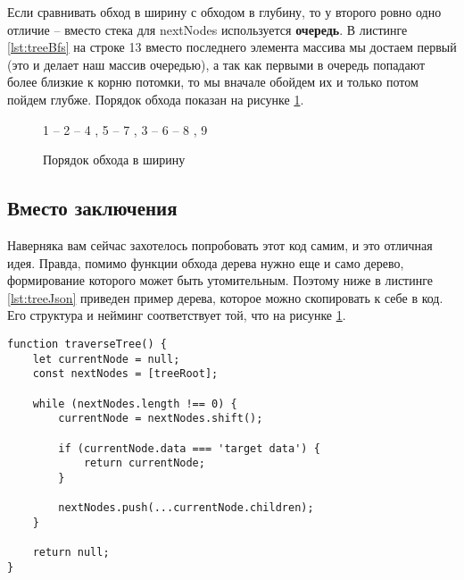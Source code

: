 \documentclass[../../article]{subfiles}
\begin{document}
Если сравнивать обход в ширину с обходом в глубину, то у второго ровно одно отличие – вместо стека для {\firacodebold nextNodes} используется {\bfseries очередь}. В листинге \ref{lst:treeBfs} на строке 13 вместо последнего элемента массива мы достаем первый (это и делает наш массив очередью), а так как первыми в очередь попадают более близкие к корню потомки, то мы вначале обойдем их и только потом пойдем глубже. Порядок обхода показан на рисунке \ref{fig:treeBfsOrder}.

\begin{figure}
    \styledgraph
    {
        1 -- { 2 -- { 4 , 5 -- 7 }, 3 -- 6 -- { 8 , 9 }}
    }
    \caption{Порядок обхода в ширину}
    \label{fig:treeBfsOrder}
\end{figure}

\subsection{Вместо заключения}
Наверняка вам сейчас захотелось попробовать этот код самим, и это отличная идея. Правда, помимо функции обхода дерева нужно еще и само дерево, формирование которого может быть утомительным. Поэтому ниже в листинге \ref{lst:treeJson} приведен пример дерева, которое можно скопировать к себе в код. Его структура и нейминг соответствует той, что на рисунке \ref{fig:treeBfsOrder}.

\begin{figure*}
    \begin{ruledelement}
        \begin{lstlisting}[caption={Обход дерева в ширину}, label={lst:treeBfs}]
function traverseTree() {
    let currentNode = null;
    const nextNodes = [treeRoot];

    while (nextNodes.length !== 0) {
        currentNode = nextNodes.shift();

        if (currentNode.data === 'target data') {
            return currentNode;
        }

        nextNodes.push(...currentNode.children);
    }

    return null;
}

        \end{lstlisting}
    \end{ruledelement}
\end{figure*}
\end{document}
